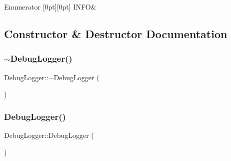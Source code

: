 \begin{DoxyEnumFields}{Enumerator}
[0pt][0pt]{}\hypertarget{class_ori_engine_1_1_debug_logger_a3ac0c97517b3aecb4ea7bdb5b98e6fe5aaa1f0e20c9d6cb0949c529b79f011b16}{}\label{class_ori_engine_1_1_debug_logger_a3ac0c97517b3aecb4ea7bdb5b98e6fe5aaa1f0e20c9d6cb0949c529b79f011b16} 
I\+N\+FO&\\
\hline

\end{DoxyEnumFields}


\subsection{Constructor \& Destructor Documentation}
\hypertarget{class_ori_engine_1_1_debug_logger_a48c9ac551189e990e03290579aa8a986}{}\label{class_ori_engine_1_1_debug_logger_a48c9ac551189e990e03290579aa8a986} 
\subsubsection{\texorpdfstring{$\sim$\+Debug\+Logger()}{~DebugLogger()}}
{\footnotesize\ttfamily Debug\+Logger\+::$\sim$\+Debug\+Logger (\begin{DoxyParamCaption}{ }\end{DoxyParamCaption})}

\hypertarget{class_ori_engine_1_1_debug_logger_a8d6cd2c43a93f46d0b19c737a88765a5}{}\label{class_ori_engine_1_1_debug_logger_a8d6cd2c43a93f46d0b19c737a88765a5} 
\subsubsection{\texorpdfstring{Debug\+Logger()}{DebugLogger()}}
{\footnotesize\ttfamily Debug\+Logger\+::\+Debug\+Logger (\begin{DoxyParamCaption}{ }\end{DoxyParamCaption})\hspace{0.3cm}{\ttfamily [private]}}



